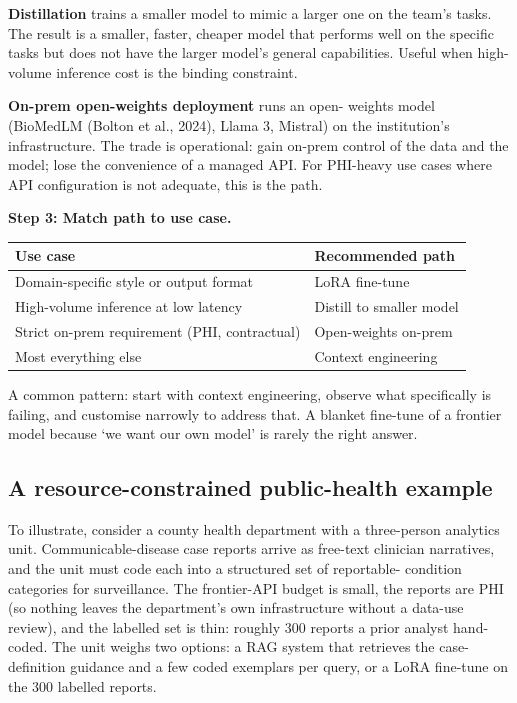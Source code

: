\documentclass[
  letterpaper,
  11pt]{scrbook}
\newcounter{none} %
\begin{document}
\textbf{Distillation} trains a smaller model to mimic a larger one on
the team's tasks. The result is a smaller, faster, cheaper model that
performs well on the specific tasks but does not have the larger model's
general capabilities. Useful when high-volume inference cost is the
binding constraint.

\textbf{On-prem open-weights deployment} runs an open- weights model
(BioMedLM (Bolton et al., 2024), Llama 3, Mistral) on the institution's
infrastructure. The trade is operational: gain on-prem control of the
data and the model; lose the convenience of a managed API. For PHI-heavy
use cases where API configuration is not adequate, this is the path.

\textbf{Step 3: Match path to use case.}

{\def\LTcaptype{none} %
\begin{longtable}[]{@{}ll@{}}
\toprule\noalign{}
Use case & Recommended path \\
\midrule\noalign{}
\endhead
\bottomrule\noalign{}
\endlastfoot
Domain-specific style or output format & LoRA fine-tune \\
High-volume inference at low latency & Distill to smaller model \\
Strict on-prem requirement (PHI, contractual) & Open-weights on-prem \\
Most everything else & Context engineering \\
\end{longtable}
}

A common pattern: start with context engineering, observe what
specifically is failing, and customise narrowly to address that. A
blanket fine-tune of a frontier model because `we want our own model' is
rarely the right answer.

\subsection{A resource-constrained public-health
example}\label{a-resource-constrained-public-health-example}

To illustrate, consider a county health department with a three-person
analytics unit. Communicable-disease case reports arrive as free-text
clinician narratives, and the unit must code each into a structured set
of reportable- condition categories for surveillance. The frontier-API
budget is small, the reports are PHI (so nothing leaves the department's
own infrastructure without a data-use review), and the labelled set is
thin: roughly 300 reports a prior analyst hand-coded. The unit weighs
two options: a RAG system that retrieves the case-definition guidance
and a few coded exemplars per query, or a LoRA fine-tune on the 300
labelled reports.
\end{document}
